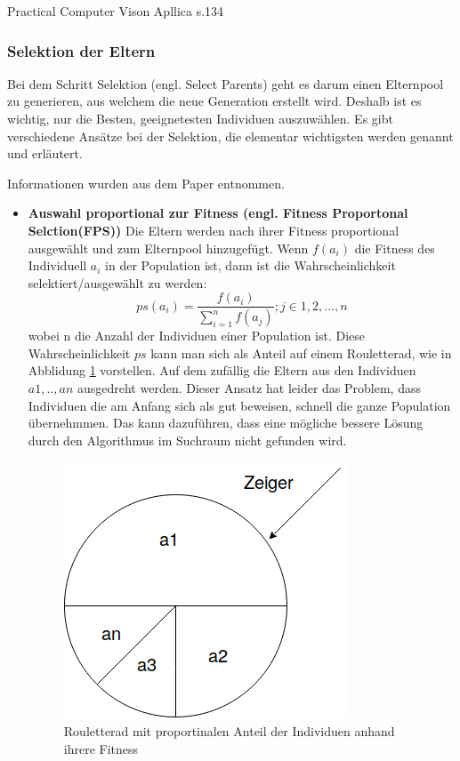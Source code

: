 Practical Computer Vison Apllica s.134


\subsubsection{Selektion der Eltern}
Bei dem Schritt Selektion (engl. Select Parents) geht es darum einen Elternpool zu generieren, aus welchem die neue Generation erstellt wird. Deshalb ist es wichtig, nur die Besten, geeignetesten Individuen auszuwählen. Es gibt verschiedene Ansätze bei der Selektion, die elementar wichtigsten werden genannt und erläutert.

Informationen wurden aus dem Paper \cite{shukla15} entnommen.


\begin{itemize}
\item \textbf{Auswahl proportional zur Fitness (engl. Fitness Proportonal Selction(FPS))} Die Eltern werden nach ihrer Fitness proportional ausgewählt und zum Elternpool hinzugefügt. Wenn $f(a_i)$ die Fitness des Individuell $a_i$ in der Population ist, dann ist die Wahrscheinlichkeit selektiert/ausgewählt zu werden:
\begin{equation}
	ps(a_i) = \frac{f(a_i)}{\sum_{i=1}^n f(a_j)}; j\in{1,2,...,n} \label{eq:1}
\end{equation}
wobei n die Anzahl der Individuen einer Population ist.
Diese Wahrscheinlichkeit $ps$ kann man sich als Anteil auf einem Rouletterad, wie in Abblidung \ref{fig:roulette_wheel} vorstellen. Auf dem zufällig die Eltern aus den Individuen $a1,..,an$ \glqq ausgedreht \grqq werden. Dieser Ansatz hat leider das Problem, dass Individuen die am Anfang sich als gut beweisen, schnell die ganze Population übernehmmen. Das kann dazuführen, dass eine mögliche bessere Lösung durch den Algorithmus im Suchraum nicht gefunden wird.

\begin{figure}[htb]
  \centering  
  \includegraphics[scale=0.5]{img/roulette_wheel.png}
  \caption{Rouletterad mit proportinalen Anteil der Individuen anhand ihrere Fitness}
  \label{fig:roulette_wheel}
\end{figure}


\end{itemize}
